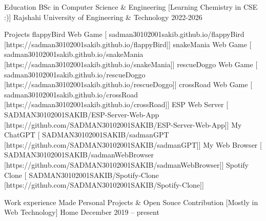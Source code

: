 \documentclass[
]{llresume}
\begin{document}
\makeheader

\begin{mainpane}
    \begin{mainsection}{Education}
        \entryJob
            {BSc in Computer Science \& Engineering}
            [Learning Chemistry in CSE :)]
            {Rajshahi University of Engineering \& Technology}
            {2022-2026}
    \end{mainsection}

    \begin{mainsection}{Projects}
        \entryGeneric
            {flappyBird Web Game}
            [\infoFlickr
                {sadman30102001sakib.github.io/flappyBird}
                [https://sadman30102001sakib.github.io/flappyBird]]
        \entryGeneric
            {snakeMania Web Game}
            [\infoFlickr
                {sadman30102001sakib.github.io/snakeMania}
                [https://sadman30102001sakib.github.io/snakeMania]]
        \entryGeneric
            {rescueDoggo Web Game}
            [\infoFlickr
                {sadman30102001sakib.github.io/rescueDoggo}
                [https://sadman30102001sakib.github.io/rescueDoggo]]
        \entryGeneric
            {crossRoad Web Game}
            [\infoFlickr
                {sadman30102001sakib.github.io/crossRoad}
                [https://sadman30102001sakib.github.io/crossRoad]]
        \entryGeneric
            {ESP Web Server}
            [\infoFlickr
                {SADMAN30102001SAKIB/ESP-Server-Web-App}
                [https://github.com/SADMAN30102001SAKIB/ESP-Server-Web-App]]
        \entryGeneric
            {My ChatGPT}
            [\infoFlickr
                {SADMAN30102001SAKIB/sadmanGPT}
                [https://github.com/SADMAN30102001SAKIB/sadmanGPT]]
        \entryGeneric
            {My Web Browser}
            [\infoFlickr
                {   SADMAN30102001SAKIB/sadmanWebBrowser}
                [https://github.com/SADMAN30102001SAKIB/sadmanWebBrowser]]
        \entryGeneric
            {Spotify Clone}
            [\infoFlickr
                {SADMAN30102001SAKIB/Spotify-Clone}
                [https://github.com/SADMAN30102001SAKIB/Spotify-Clone]]
    \end{mainsection}

    \begin{mainsection}{Work experience}
        \entryJob
            {Made Personal Projects \& Open Souce Contribution}
            [Mostly in Web Technology]
            {Home}
            {December 2019 -- present}
    \end{mainsection}


\end{mainpane}
\end{document}

